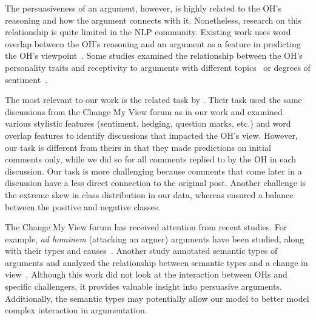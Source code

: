 \documentclass[11pt,a4paper]{article}
\begin{document}
The persuasiveness of an argument, however, is highly related to the OH's reasoning and how the argument connects with it. Nonetheless, research on this relationship is quite limited in the NLP community.
Existing work uses word overlap between the OH's reasoning and an argument as a feature in predicting the OH's viewpoint~\cite{Tan:2016bk}. Some studies examined the relationship between the OH's personality traits and receptivity to arguments with different topics~\cite{Ding:2016uq} or degrees of sentiment~\cite{Lukin:2017vla}. 

The most relevant to our work is the related task by . Their task used the same discussions from the Change My View forum as in our work and examined various stylistic features (sentiment, hedging, question marks, etc.) and word overlap features to identify discussions that impacted the OH's view. However, our task is different from theirs in that they made predictions on initial comments only, while we did so for all comments replied to by the OH in each discussion. Our task is more challenging because comments that come later in a discussion have a less direct connection to the original post. Another challenge is the extreme skew in class distribution in our data, whereas  ensured a balance between the positive and negative classes.

The Change My View forum has received attention from recent studies. For example, \emph{ad hominem} (attacking an arguer) arguments have been studied, along with their types and causes~\cite{Habernal:2018uf}. Another study annotated semantic types of arguments and analyzed the relationship between semantic types and a change in view~\cite{Hidey:2017tt}. Although this work did not look at the interaction between OHs and specific challengers, it provides valuable insight into persuasive arguments. Additionally, the semantic types may potentially allow our model to better model complex interaction in argumentation.


\end{document}
